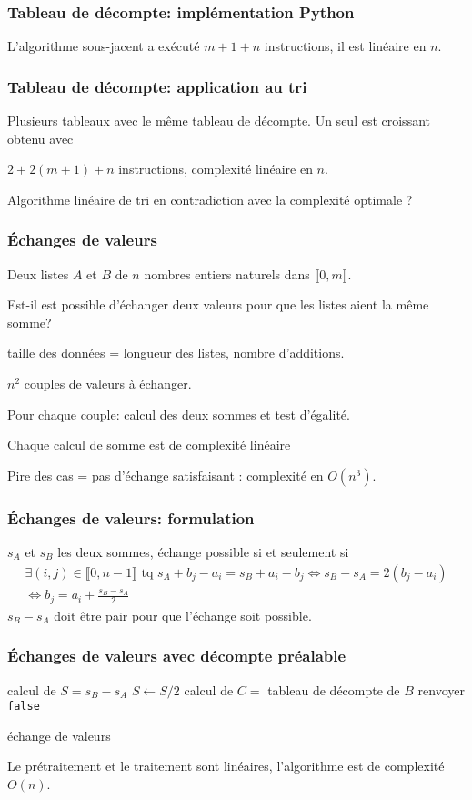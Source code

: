 \begin{frame}
  \frametitle{Tableau de décompte: implémentation Python}

L'algorithme sous-jacent a exécuté $m+1+n$ instructions, il est linéaire en $n$.
\end{frame}

\begin{frame}
  \frametitle{Tableau de décompte: application au tri}
Plusieurs tableaux avec le même tableau de décompte. Un seul est croissant obtenu avec

$2+2(m+1)+n$ instructions, complexité linéaire en $n$.

Algorithme linéaire de tri en contradiction avec la complexité optimale ?
\end{frame}

\begin{frame}
  \frametitle{\'Echanges de valeurs}
Deux listes $A$ et $B$ de $n$ nombres entiers naturels dans $\llbracket 0,m\rrbracket$.

Est-il est possible d'échanger deux valeurs pour que les listes aient la même somme? 

taille des données = longueur des listes, nombre d'additions.

$n^2$ couples de valeurs à échanger. 

Pour chaque couple: calcul des deux sommes et test d'égalité.

Chaque calcul de somme est de complexité linéaire

Pire des cas = pas d'échange satisfaisant : complexité en $O(n^3)$.
\end{frame}

\begin{frame}
  \frametitle{\'Echanges de valeurs: formulation}
$s_A$ et $s_B$ les deux sommes, échange possible si et seulement si 
\begin{multline*}
  \exists (i,j)\in \llbracket 0, n-1 \rrbracket \text{ tq } s_A + b_j -a_i = s_B + a_i - b_j\Leftrightarrow s_B - s_A = 2(b_j - a_i)\\
\Leftrightarrow b_j = a_i + \frac{s_B - s_A}{2}
\end{multline*}
$s_B - s_A$ doit être pair pour que l'échange soit possible.
\end{frame}

\begin{frame}
  \frametitle{\'Echanges de valeurs avec décompte préalable}
\begin{algorithm}[H]
  calcul de $S = s_B - s_A$\;
  $S \leftarrow S/2$\;
  calcul de $C=$ tableau de décompte de $B$\;
  renvoyer \texttt{false}\;
  \caption{échange de valeurs}
  \label{complexite_3}
\end{algorithm}
Le prétraitement et le traitement sont linéaires, l'algorithme est de complexité $O(n)$.
\end{frame}

